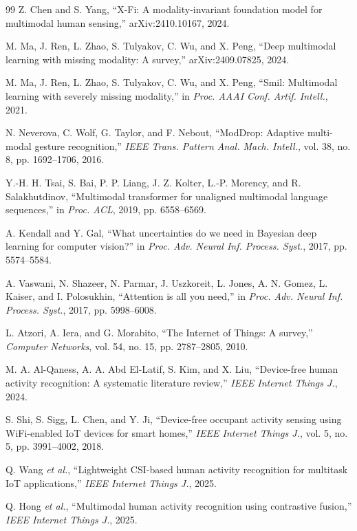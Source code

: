 ﻿\documentclass[UTF8,twocolumn]{ctexart}
\begin{document}
{\begin{thebibliography}{99}
Z. Chen and S. Yang, ``X-Fi: A modality-invariant foundation model for multimodal human sensing,'' arXiv:2410.10167, 2024.

M. Ma, J. Ren, L. Zhao, S. Tulyakov, C. Wu, and X. Peng, ``Deep multimodal learning with missing modality: A survey,'' arXiv:2409.07825, 2024.

M. Ma, J. Ren, L. Zhao, S. Tulyakov, C. Wu, and X. Peng, ``Smil: Multimodal learning with severely missing modality,'' in \emph{Proc. AAAI Conf. Artif. Intell.}, 2021.

N. Neverova, C. Wolf, G. Taylor, and F. Nebout, ``ModDrop: Adaptive multi-modal gesture recognition,'' \emph{IEEE Trans. Pattern Anal. Mach. Intell.}, vol. 38, no. 8, pp. 1692--1706, 2016.

Y.-H. H. Tsai, S. Bai, P. P. Liang, J. Z. Kolter, L.-P. Morency, and R. Salakhutdinov, ``Multimodal transformer for unaligned multimodal language sequences,'' in \emph{Proc. ACL}, 2019, pp. 6558--6569.

A. Kendall and Y. Gal, ``What uncertainties do we need in Bayesian deep learning for computer vision?'' in \emph{Proc. Adv. Neural Inf. Process. Syst.}, 2017, pp. 5574--5584.

A. Vaswani, N. Shazeer, N. Parmar, J. Uszkoreit, L. Jones, A. N. Gomez, L. Kaiser, and I. Polosukhin, ``Attention is all you need,'' in \emph{Proc. Adv. Neural Inf. Process. Syst.}, 2017, pp. 5998--6008.

L. Atzori, A. Iera, and G. Morabito, ``The Internet of Things: A survey,'' \emph{Computer Networks}, vol. 54, no. 15, pp. 2787--2805, 2010.

M. A. Al-Qaness, A. A. Abd El-Latif, S. Kim, and X. Liu, ``Device-free human activity recognition: A systematic literature review,'' \emph{IEEE Internet Things J.}, 2024.

S. Shi, S. Sigg, L. Chen, and Y. Ji, ``Device-free occupant activity sensing using WiFi-enabled IoT devices for smart homes,'' \emph{IEEE Internet Things J.}, vol. 5, no. 5, pp. 3991--4002, 2018.

Q. Wang \emph{et al.}, ``Lightweight CSI-based human activity recognition for multitask IoT applications,'' \emph{IEEE Internet Things J.}, 2025.

Q. Hong \emph{et al.}, ``Multimodal human activity recognition using contrastive fusion,'' \emph{IEEE Internet Things J.}, 2025.


\end{thebibliography}}
\end{document}

